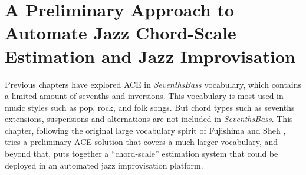 

\chapter{A Preliminary Approach to Automate Jazz Chord-Scale Estimation and Jazz Improvisation}\label{cp:jazz} %




Previous chapters have explored ACE in \textit{SeventhsBass} vocabulary, which contains a limited amount of sevenths and inversions. This vocabulary is most used in music styles such as pop, rock, and folk songs. But chord types such as sevenths extensions, suspensions and alternations are not included in \textit{SeventhsBass}. This chapter, following the original large vocabulary spirit of Fujishima \cite{fujishima1999realtime} and Sheh \cite{sheh2003chord}, tries a preliminary ACE solution that covers a much larger vocabulary, and beyond that, puts together a ``chord-scale'' estimation system that could be deployed in an automated jazz improvisation platform.

